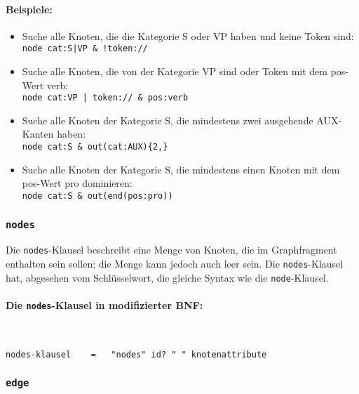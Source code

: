 \documentclass[12pt]{scrartcl}
\begin{document}
\paragraph*{Beispiele:}
\begin{itemize}
	\item Suche alle Knoten, die die Kategorie S oder VP haben und keine Token sind:\\
	{\tt node cat:S|VP \& !token://}
	\item Suche alle Knoten, die von der Kategorie VP sind oder Token mit dem pos-Wert verb:\\
	{\tt node cat:VP | token:// \& pos:verb}
	\item Suche alle Knoten der Kategorie S, die mindestens zwei ausgehende AUX-Kanten haben:\\
	{\tt node cat:S \& out(cat:AUX)\{2,\}}
	\item Suche alle Knoten der Kategorie S, die mindestens einen Knoten mit dem pos-Wert pro dominieren:\\
	{\tt node cat:S \& out(end(pos:pro))}
\end{itemize}



\subsubsection{\texttt{nodes}}

Die \texttt{nodes}-Klausel beschreibt eine Menge von Knoten, die im Graphfragment enthalten sein sollen; die Menge kann jedoch auch leer sein. Die \texttt{nodes}-Klausel hat, abgesehen vom Schlüsselwort,  die gleiche Syntax wie die \texttt{node}-Klausel.

\paragraph*{Die \texttt{nodes}-Klausel in modifizierter BNF:}
~
\begin{framed}
\begin{lstlisting}
nodes-klausel    =   "nodes" id? " " knotenattribute
\end{lstlisting}
\end{framed}






\subsubsection{\texttt{edge}}\label{edge}
\end{document}
